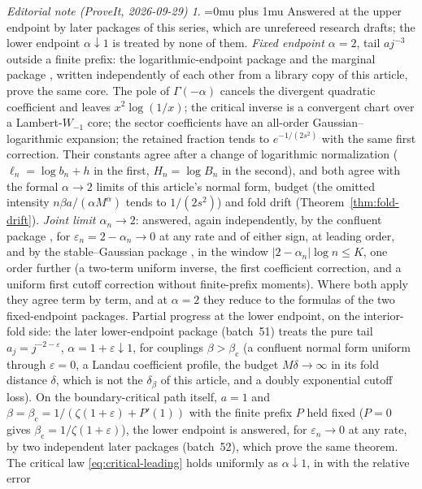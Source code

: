 \documentclass[11pt,a4paper]{article}
\numberwithin{equation}{section}
\theoremstyle{definition}
\theoremstyle{remark}
\newtheorem*{ednoteinner}{Editorial note (ProveIt, 2026-09-29)}
\newenvironment{ednote}{\begin{ednoteinner}\sloppy\Urlmuskip=0mu plus 1mu\relax}{\end{ednoteinner}}
\newcommand{\bc}{\beta_{\mathrm c}}
\begin{document}
\begin{ednote}
Answered at the upper endpoint by later packages of this series, which are
unrefereed research drafts; the lower endpoint $\alpha\downarrow1$ is treated
by none of them.
\emph{Fixed endpoint $\alpha=2$}, tail $a j^{-3}$ outside a finite prefix:
the logarithmic-endpoint package \cite{ed:lce} and the marginal package
\cite{ed:mct}, written independently of each other from a library copy of
this article, prove the same core. The pole of $\Gamma(-\alpha)$ cancels the
divergent quadratic coefficient and leaves $x^2\log(1/x)$; the critical
inverse is a convergent chart over a Lambert-$W_{-1}$ core; the sector
coefficients have an all-order Gaussian--logarithmic expansion; the retained
fraction tends to $e^{-1/(2s^2)}$ with the same first correction. Their
constants agree after a change of logarithmic normalization
($\ell_n=\log b_n+h$ in the first, $H_n=\log B_n$ in the second), and both
agree with the formal $\alpha\to2$ limits of this article's normal form,
budget (the omitted intensity $n\beta a/(\alpha M^\alpha)$ tends to
$1/(2s^2)$) and fold drift (Theorem~\ref{thm:fold-drift}).
\emph{Joint limit $\alpha_n\to2$}: answered, again independently, by the
confluent package \cite{ed:cct}, for $\varepsilon_n=2-\alpha_n\to0$ at any
rate and of either sign, at leading order, and by the stable--Gaussian
package \cite{ed:sge}, in the window $|2-\alpha_n|\log n\le K$, one order
further (a two-term uniform inverse, the first coefficient correction, and a
uniform first cutoff correction without finite-prefix moments). Where both
apply they agree term by term, and at $\alpha=2$ they reduce to the formulas
of the two fixed-endpoint packages.
Partial progress at the lower endpoint, on the interior-fold side: the
later lower-endpoint package \cite{ed:lcl} (batch~51) treats the pure tail
$a_j=j^{-2-\varepsilon}$, $\alpha=1+\varepsilon\downarrow1$, for couplings
$\beta>\bc$ (a confluent normal form uniform through $\varepsilon=0$, a
Landau coefficient profile, the budget $M\delta\to\infty$ in its fold
distance $\delta$, which is not the $\delta_\beta$ of this article, and a
doubly exponential cutoff loss).
On the boundary-critical path itself, $a=1$ and
$\beta=\bc=1/(\zeta(1+\varepsilon)+P'(1))$ with the finite prefix $P$
held fixed ($P=0$ gives $\bc=1/\zeta(1+\varepsilon)$), the lower endpoint
is answered, for $\varepsilon_n\to0$ at any rate, by two independent later
packages \cite{ed:lcc,ed:lcu} (batch~52), which prove the same theorem. The
critical law \eqref{eq:critical-leading} holds uniformly as
$\alpha\downarrow1$, in \cite{ed:lcu} with the relative error

\end{ednote}
\end{document}
